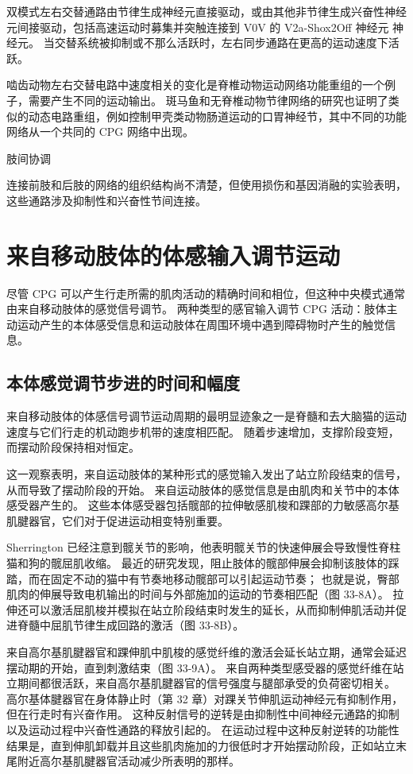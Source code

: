 双模式左右交替通路由节律生成神经元直接驱动，或由其他非节律生成兴奋性神经元间接驱动，包括高速运动时募集并突触连接到 V0V 的 V2a-Shox2Off 神经元 神经元。 当交替系统被抑制或不那么活跃时，左右同步通路在更高的运动速度下活跃。

啮齿动物左右交替电路中速度相关的变化是脊椎动物运动网络功能重组的一个例子，需要产生不同的运动输出。 斑马鱼和无脊椎动物节律网络的研究也证明了类似的动态电路重组，例如控制甲壳类动物肠道运动的口胃神经节，其中不同的功能网络从一个共同的 CPG 网络中出现。

肢间协调

连接前肢和后肢的网络的组织结构尚不清楚，但使用损伤和基因消融的实验表明，这些通路涉及抑制性和兴奋性节间连接。

\section{来自移动肢体的体感输入调节运动}
尽管 CPG 可以产生行走所需的肌肉活动的精确时间和相位，但这种中央模式通常由来自移动肢体的感觉信号调节。 两种类型的感官输入调节 CPG 活动：肢体主动运动产生的本体感受信息和运动肢体在周围环境中遇到障碍物时产生的触觉信息。

\subsection{本体感觉调节步进的时间和幅度}
来自移动肢体的体感信号调节运动周期的最明显迹象之一是脊髓和去大脑猫的运动速度与它们行走的机动跑步机带的速度相匹配。 随着步速增加，支撑阶段变短，而摆动阶段保持相对恒定。

这一观察表明，来自运动肢体的某种形式的感觉输入发出了站立阶段结束的信号，从而导致了摆动阶段的开始。 来自运动肢体的感觉信息是由肌肉和关节中的本体感受器产生的。 这些本体感受器包括髋部的拉伸敏感肌梭和踝部的力敏感高尔基肌腱器官，它们对于促进运动相变特别重要。

Sherrington 已经注意到髋关节的影响，他表明髋关节的快速伸展会导致慢性脊柱猫和狗的髋屈肌收缩。 最近的研究发现，阻止肢体的髋部伸展会抑制该肢体的踩踏，而在固定不动的猫中有节奏地移动髋部可以引起运动节奏； 也就是说，臀部肌肉的伸展导致电机输出的时间与外部施加的运动的节奏相匹配（图 33-8A）。 拉伸还可以激活屈肌梭并模拟在站立阶段结束时发生的延长，从而抑制伸肌活动并促进脊髓中屈肌节律生成回路的激活（图 33-8B）。

来自高尔基肌腱器官和踝伸肌中肌梭的感觉纤维的激活会延长站立期，通常会延迟摆动期的开始，直到刺激结束（图 33-9A）。 来自两种类型感受器的感觉纤维在站立期间都很活跃，来自高尔基肌腱器官的信号强度与腿部承受的负荷密切相关。 高尔基体腱器官在身体静止时（第 32 章）对踝关节伸肌运动神经元有抑制作用，但在行走时有兴奋作用。 这种反射信号的逆转是由抑制性中间神经元通路的抑制以及运动过程中兴奋性通路的释放引起的。 在运动过程中这种反射逆转的功能性结果是，直到伸肌卸载并且这些肌肉施加的力很低时才开始摆动阶段，正如站立末尾附近高尔基肌腱器官活动减少所表明的那样。

